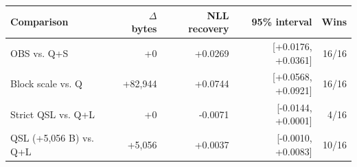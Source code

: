 \begin{tabular}{lrrrr}
\toprule
Comparison & $\Delta$ bytes & NLL recovery & 95\% interval & Wins \\
\midrule
OBS vs. Q+S & +0 & +0.0269 & [+0.0176, +0.0361] & 16/16 \\
Block scale vs. Q & +82,944 & +0.0744 & [+0.0568, +0.0921] & 16/16 \\
Strict QSL vs. Q+L & +0 & -0.0071 & [-0.0144, +0.0001] & 4/16 \\
QSL (+5{,}056 B) vs. Q+L & +5,056 & +0.0037 & [-0.0010, +0.0083] & 10/16 \\
\bottomrule
\end{tabular}
